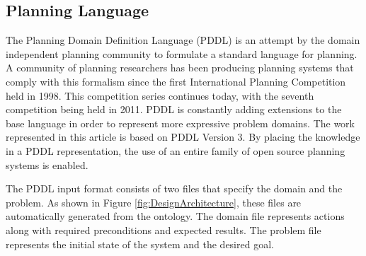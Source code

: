 \subsection{Planning Language}
The Planning Domain Definition Language (PDDL) \cite{PDDL} is an attempt by the
domain independent planning community to formulate a standard language
for planning. A community of planning researchers has been producing
planning systems that comply with this formalism since the first International
Planning Competition held in 1998. This competition series continues today,
with the seventh competition being held in 2011. PDDL is constantly
adding extensions to the base language in order to represent more expressive
problem domains. The work represented in this article is based on PDDL Version 3.
By placing the knowledge in a PDDL representation, the use of an
entire family of open source planning systems is enabled.

The PDDL input format consists
of two files that specify the domain and the problem. As shown in Figure
\ref{fig:DesignArchitecture}, these files are automatically
generated from the ontology. The domain file represents actions along
with required preconditions and expected results. The problem file
represents the initial state of the system and the desired goal.


